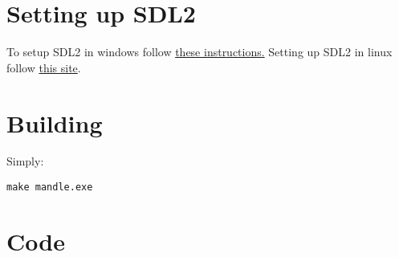 \documentclass[a4paper,11pt]{article}
\begin{document}
\section{Setting up SDL2}
\label{sec:org66de831}
To setup SDL2 in windows follow \href{https://gist.github.com/thales17/fb2e4cff60890a51d9dddd4c6e832ad2}{these instructions.} Setting up SDL2 in linux follow \href{https://gigi.nullneuron.net/gigilabs/how-to-set-up-sdl2-on-linux/}{this site}.
\section{Building}
\label{sec:org53b7efb}
Simply:
\begin{verbatim}
make mandle.exe
\end{verbatim}
\section{Code}
\label{sec:org55f2aff}
\end{document}
